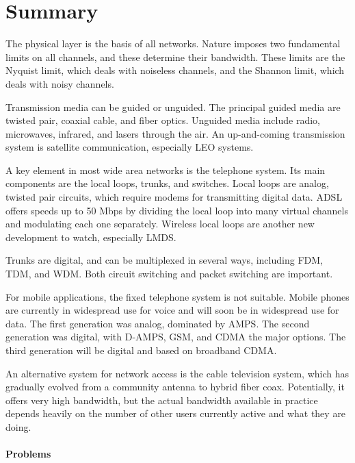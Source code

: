 \section{Summary}

The physical layer is the basis of all networks. Nature imposes two
fundamental limits on all channels, and these determine their bandwidth.
These limits are the Nyquist limit, which deals with noiseless channels,
and the Shannon limit, which deals with noisy channels.

Transmission media can be guided or unguided. The principal guided media
are twisted pair, coaxial cable, and fiber optics. Unguided media
include radio, microwaves, infrared, and lasers through the air. An
up-and-coming transmission system is satellite communication, especially
LEO systems.

A key element in most wide area networks is the telephone system. Its
main components are the local loops, trunks, and switches. Local loops
are analog, twisted pair circuits, which require modems for transmitting
digital data. ADSL offers speeds up to 50 Mbps by dividing the local
loop into many virtual channels and modulating each one separately.
Wireless local loops are another new development to watch, especially
LMDS.

Trunks are digital, and can be multiplexed in several ways, including
FDM, TDM, and WDM. Both circuit switching and packet switching are
important.

For mobile applications, the fixed telephone system is not suitable.
Mobile phones are currently in widespread use for voice and will soon be
in widespread use for data. The first generation was analog, dominated
by AMPS. The second generation was digital, with D-AMPS, GSM, and CDMA
the major options. The third generation will be digital and based on
broadband CDMA.

An alternative system for network access is the cable television system,
which has gradually evolved from a community antenna to hybrid fiber
coax. Potentially, it offers very high bandwidth, but the actual
bandwidth available in practice depends heavily on the number of other
users currently active and what they are doing.

\protect\hypertarget{0130661023_ch02lev1sec8.htmlux5cux23ch02lev2sec30}{}{}

\paragraph{Problems}

